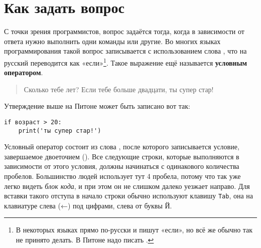 %
%
%

\chapter{Как задать вопрос}\label{ch:howtoaskaquestion}

С точки зрения программистов, вопрос задаётся тогда, когда в зависимости от ответа нужно выполнить одни команды или другие. Во многих языках программирования такой вопрос записывается с использованием слова , что на русский переводится как «если»\footnote{В некоторых языках прямо по-русски и пишут «если», но всё же обычно так не принято делать. В Питоне надо писать .}. Такое выражение ещё называется \textbf{условным оператором}.

\begin{quotation}
Сколько тебе лет? Если тебе больше двадцати, ты супер стар!
\end{quotation}

Утверждение выше на Питоне может быть записано вот так:

\begin{listing}
\begin{verbatim}
if возраст > 20:
    print('ты супер стар!')
\end{verbatim}
\end{listing}

Условный оператор состоит из слова , после которого записывается условие, завершаемое двоеточием (\code{:}). Все следующие строки, которые выполняются в зависимости от этого условия, должны начинаться с одинакового количества пробелов. Большинство людей использует тут 4 пробела, потому что так уже легко видеть \textit{блок кода}, и при этом он не слишком далеко уезжает направо. Для вставки такого отступа в начало строки обычно используют клавишу \texttt{Tab}, она на клавиатуре слева (←) под цифрами, слева от буквы Й.

